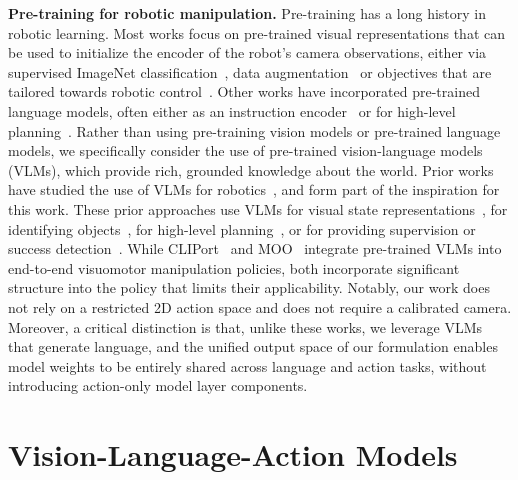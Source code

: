 \documentclass[11pt, a4paper, logo, copyright]{deepmind}
\begin{document}
\textbf{Pre-training for robotic manipulation.} Pre-training has a long history in robotic learning. Most works focus on pre-trained visual representations that can be used to initialize the encoder of the robot's camera observations, either via supervised ImageNet classification~\citep{shah2021rrl}, data augmentation~\citep{laskin2020reinforcement,laskin2020curl,kostrikov2020image,pari2021surprising} or objectives that are tailored towards robotic control~\citep{nair2022r3m,ma2022vip,xiao2022masked,karamcheti2023language,majumdar2023we}. Other works have incorporated pre-trained language models, often either as an instruction encoder~\citep{hill2020human,lynch2020language,nair2022learning,jang2022bc,jiang2022vima,brohan2022rt,shridhar2022perceiver} or for high-level planning~\citep{huang2022language,ahn2022can,driess2023palm,singh2022progprompt,wu2023tidybot,mu2023embodiedgpt}. Rather than using pre-training vision models or pre-trained language models, we specifically consider the use of pre-trained vision-language models (VLMs), which provide rich, grounded knowledge about the world. Prior works have studied the use of VLMs for robotics~\citep{shridhar2021cliport,karamcheti2023language,stone2023open,driess2023palm,gadre2022clip,pmlr-v205-shah23b,du2023vision}, and form part of the inspiration for this work. These prior approaches use VLMs for visual state representations~\citep{karamcheti2023language}, for identifying objects~\citep{stone2023open,gadre2022clip}, for high-level planning~\citep{driess2023palm}, or for providing supervision or success detection~\citep{xiao2022robotic,du2023vision,sumers2023distilling,zhang2023grounding,ma2023liv}. While CLIPort~\citep{shridhar2021cliport} and MOO~\citep{stone2023open} integrate pre-trained VLMs into end-to-end visuomotor manipulation policies, both incorporate significant structure into the policy that limits their applicability. Notably, our work does not rely on a restricted 2D action space and does not require a calibrated camera. %
Moreover, a critical distinction is that, unlike these works, we leverage VLMs that generate language, and the unified output space of our formulation enables model weights to be entirely shared across language and action tasks, without introducing action-only model layer components.   







\section{Vision-Language-Action Models}
\end{document}
